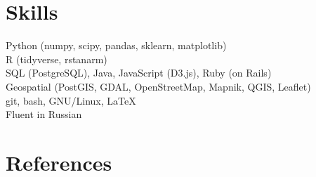 \documentclass[margin,line]{resume}
\begin{document}
\begin{resume}




    \section{\mysidestyle Skills}
		Python (numpy, scipy, pandas, sklearn, matplotlib) \\
                R (tidyverse, rstanarm) \\
                SQL (PostgreSQL), Java, JavaScript (D3.js), Ruby (on Rails)\\
                Geospatial (PostGIS, GDAL, OpenStreetMap, Mapnik, QGIS, Leaflet)\\
                git, bash, GNU/Linux, \LaTeX\\
                Fluent in Russian
	\section{\mysidestyle References}
		\begin{itemize}


\end{itemize}
\end{resume}
\end{document}
